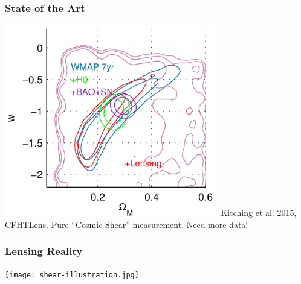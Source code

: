 \documentclass{beamer}
\begin{document}
\frame
{
    \frametitle{State of the Art}

    \begin{center}
        \includegraphics[width=0.7\textwidth]{cfht-wmap-crop.png}
        \newline
        Kitching et al. 2015, CFHTLens.  Pure ``Cosmic Shear'' measurement.  Need more data!
    \end{center}

}



\frame
{
    \frametitle{Lensing Reality}

    \begin{center}
        \texttt{[image: shear-illustration.jpg]}
        \newline
    \end{center}

}
\end{document}
